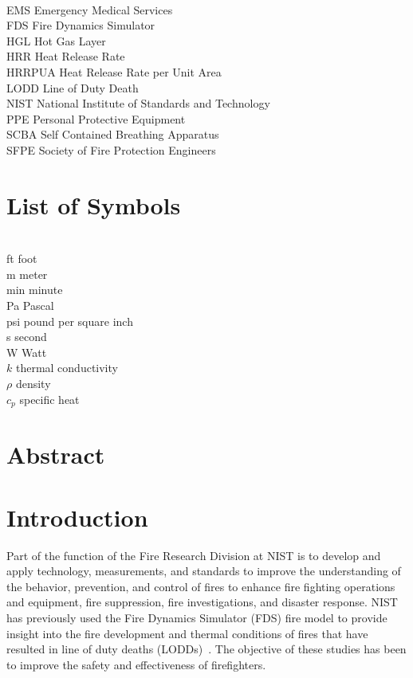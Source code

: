 \documentclass[12pt,oneside]{book}
\begin{document}
\begin{tabbing}
\hspace{1.5in} \= \\
EMS \> Emergency Medical Services \\
FDS \> Fire Dynamics Simulator \\
HGL \> Hot Gas Layer \\
HRR \> Heat Release Rate \\
HRRPUA \> Heat Release Rate per Unit Area \\
LODD \> Line of Duty Death \\
NIST \> National Institute of Standards and Technology \\
PPE \> Personal Protective Equipment \\
SCBA \> Self Contained Breathing Apparatus \\
SFPE \> Society of Fire Protection Engineers \\
\end{tabbing}

\chapter{List of Symbols}

\begin{tabbing}
\hspace{1.5in} \= \\
ft \> foot \\
m \> meter \\
min \> minute \\
Pa \> Pascal \\
psi \> pound per square inch \\
s \> second \\
W \> Watt \\
$k$ \> thermal conductivity \\
$\rho$ \> density \\
$c_{p}$ \> specific heat \\
\end{tabbing}

\mainmatter

\chapter*{\centering Abstract}

\chapter{Introduction}
\setcounter{page}{1}
Part of the function of the Fire Research Division at NIST is to develop and apply technology, measurements, and standards to improve the understanding of the behavior, prevention, and control of fires to enhance fire fighting operations and equipment, fire suppression, fire investigations, and disaster response. NIST has previously used the Fire Dynamics Simulator (FDS) fire model to provide insight into the fire development and thermal conditions of fires that have resulted in line of duty deaths (LODDs)~\cite{Madrzykowski:1,Iowa,Texas,Bryner:Charleston,barowy:texas,Weinschenk:Chicago}. The objective of these studies has been to improve the safety and effectiveness of firefighters.
\end{document}
